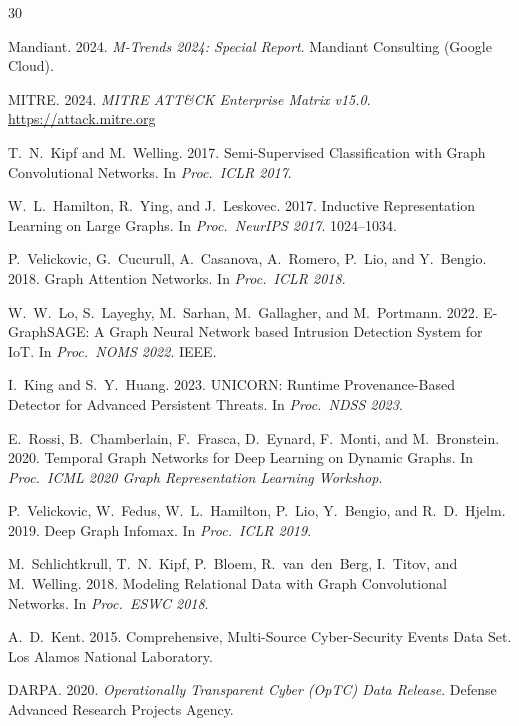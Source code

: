 \documentclass[sigconf,nonacm]{acmart}
\begin{document}
\sloppy

\begin{thebibliography}{30}

Mandiant. 2024. \textit{M-Trends 2024: Special Report}.
Mandiant Consulting (Google Cloud).

MITRE. 2024. \textit{MITRE ATT\&CK Enterprise Matrix v15.0}.
\url{https://attack.mitre.org}

T.~N.~Kipf and M.~Welling. 2017. Semi-Supervised Classification with Graph
Convolutional Networks. In \textit{Proc.\ ICLR 2017}.

W.~L.~Hamilton, R.~Ying, and J.~Leskovec. 2017. Inductive Representation
Learning on Large Graphs. In \textit{Proc.\ NeurIPS 2017}. 1024--1034.

P.~Velickovic, G.~Cucurull, A.~Casanova, A.~Romero, P.~Lio, and Y.~Bengio.
2018. Graph Attention Networks. In \textit{Proc.\ ICLR 2018}.

W.~W.~Lo, S.~Layeghy, M.~Sarhan, M.~Gallagher, and M.~Portmann. 2022.
E-GraphSAGE: A Graph Neural Network based Intrusion Detection System for
IoT. In \textit{Proc.\ NOMS 2022}. IEEE.

I.~King and S.~Y.~Huang. 2023. UNICORN: Runtime Provenance-Based Detector
for Advanced Persistent Threats. In \textit{Proc.\ NDSS 2023}.

E.~Rossi, B.~Chamberlain, F.~Frasca, D.~Eynard, F.~Monti, and M.~Bronstein.
2020. Temporal Graph Networks for Deep Learning on Dynamic Graphs.
In \textit{Proc.\ ICML 2020 Graph Representation Learning Workshop}.

P.~Velickovic, W.~Fedus, W.~L.~Hamilton, P.~Lio, Y.~Bengio, and R.~D.~Hjelm.
2019. Deep Graph Infomax. In \textit{Proc.\ ICLR 2019}.

M.~Schlichtkrull, T.~N.~Kipf, P.~Bloem, R.~van~den~Berg, I.~Titov, and
M.~Welling. 2018. Modeling Relational Data with Graph Convolutional Networks.
In \textit{Proc.\ ESWC 2018}.

A.~D.~Kent. 2015. Comprehensive, Multi-Source Cyber-Security Events Data Set.
Los Alamos National Laboratory.

DARPA. 2020. \textit{Operationally Transparent Cyber (OpTC) Data Release}.
Defense Advanced Research Projects Agency.


\end{thebibliography}
\end{document}
